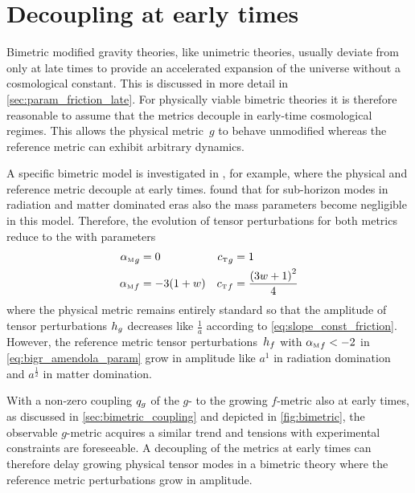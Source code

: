 

\section{Decoupling at early times}

Bimetric modified gravity theories, like unimetric theories, usually deviate from \LCDM{} only at late times to provide an accelerated expansion of the universe without a cosmological constant. This is discussed in more detail in \autoref{sec:param_friction_late}. For physically viable bimetric theories it is therefore reasonable to assume that the metrics decouple in early-time cosmological regimes. This allows the physical metric~\(g\) to behave unmodified whereas the reference metric can exhibit arbitrary dynamics.

A specific bimetric model is investigated in \autocite{Amendola2015}, for example, where the physical and reference metric decouple at early times. \Textcite{Amendola2015} found that for sub-horizon modes in radiation and matter dominated eras also the mass parameters become negligible in this model. Therefore, the evolution of tensor perturbations for both metrics reduce to the  with parameters \autocite{Amendola2015}
\begin{subequations}
\begin{align}
	\alphaMofmetr{g} &= 0 & \cTofmetr{g} &= 1 \\
	\alphaMofmetr{f} &= -3(1+\eosp) & \cTofmetr{f} &= \frac{\del{3\eosp + 1}^2}{4} \label{eq:bigr_amendola_param}
\end{align}
\end{subequations}
where the physical metric remains entirely standard so that the amplitude of tensor perturbations \(h_{g}\) decreases like \(\frac{1}{a}\) according to \eqref{eq:slope_const_friction}. However, the reference metric tensor perturbations~\(h_{f}\) with \({\alpha_{\textnormal{\tiny{M}}}}_{f}<-2\) in \eqref{eq:bigr_amendola_param} grow in amplitude like \(a^1\) in radiation domination and \(a^\frac{1}{2}\) in matter domination.

With a non-zero coupling \(q_{g}\) of the \(g\)- to the growing \(f\)-metric also at early times, as discussed in \autoref{sec:bimetric_coupling} and depicted in \autoref{fig:bimetric}, the observable \(g\)-metric acquires a similar trend and tensions with experimental constraints are foreseeable. A decoupling of the metrics at early times can therefore delay growing physical tensor modes in a bimetric theory where the reference metric perturbations grow in amplitude.



